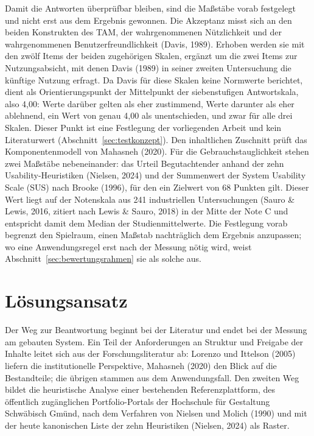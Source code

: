 Damit die Antworten überprüfbar bleiben, sind die Maßstäbe vorab festgelegt und nicht erst aus dem Ergebnis gewonnen. Die Akzeptanz misst sich an den beiden Konstrukten des TAM, der wahrgenommenen Nützlichkeit und der wahrgenommenen Benutzerfreundlichkeit (Davis, 1989). Erhoben werden sie mit den zwölf Items der beiden zugehörigen Skalen, ergänzt um die zwei Items zur Nutzungsabsicht, mit denen Davis (1989) in seiner zweiten Untersuchung die künftige Nutzung erfragt. Da Davis für diese Skalen keine Normwerte berichtet, dient als Orientierungspunkt der Mittelpunkt der siebenstufigen Antwortskala, also 4,00: Werte darüber gelten als eher zustimmend, Werte darunter als eher ablehnend, ein Wert von genau 4,00 als unentschieden, und zwar für alle drei Skalen. Dieser Punkt ist eine Festlegung der vorliegenden Arbeit und kein Literaturwert (Abschnitt~\ref{sec:testkonzept}). Den inhaltlichen Zuschnitt prüft das Komponentenmodell von Mahasneh (2020). Für die Gebrauchstauglichkeit stehen zwei Maßstäbe nebeneinander: das Urteil Begutachtender anhand der zehn Usability-Heuristiken (Nielsen, 2024) und der Summenwert der System Usability Scale (SUS) nach Brooke (1996), für den ein Zielwert von 68 Punkten gilt. Dieser Wert liegt auf der Notenskala aus 241 industriellen Untersuchungen (Sauro \& Lewis, 2016, zitiert nach Lewis \& Sauro, 2018) in der Mitte der Note C und entspricht damit dem Median der Studienmittelwerte. Die Festlegung vorab begrenzt den Spielraum, einen Maßstab nachträglich dem Ergebnis anzupassen; wo eine Anwendungsregel erst nach der Messung nötig wird, weist Abschnitt~\ref{sec:bewertungsrahmen} sie als solche aus.

\section{Lösungsansatz}
\label{sec:loesungsansatz}

Der Weg zur Beantwortung beginnt bei der Literatur und endet bei der Messung am gebauten System. Ein Teil der Anforderungen an Struktur und Freigabe der Inhalte leitet sich aus der Forschungsliteratur ab: Lorenzo und Ittelson (2005) liefern die institutionelle Perspektive, Mahasneh (2020) den Blick auf die Bestandteile; die übrigen stammen aus dem Anwendungsfall. Den zweiten Weg bildet die heuristische Analyse einer bestehenden Referenzplattform, des öffentlich zugänglichen Portfolio-Portals der Hochschule für Gestaltung Schwäbisch Gmünd, nach dem Verfahren von Nielsen und Molich (1990) und mit der heute kanonischen Liste der zehn Heuristiken (Nielsen, 2024) als Raster.

